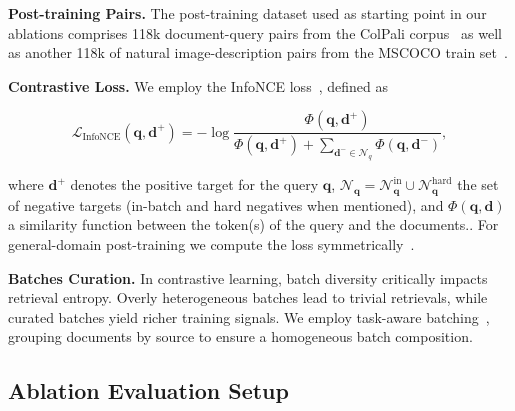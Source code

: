 

\noindent\textbf{Post-training Pairs.} The post-training dataset used as starting point in our ablations comprises 118k document-query pairs from the ColPali corpus~\cite{faysse2025colpaliefficientdocumentretrieval} as well as another 118k of natural image-description pairs from the MSCOCO train set~.

\textbf{Contrastive Loss.} We employ the InfoNCE loss~, defined as

\begin{equation}
\mathcal{L}_{\text{InfoNCE}}(\mathbf{q},\mathbf{d^+})
  =-\log\frac{\Phi(\mathbf{q},\mathbf{d^+})}{\Phi(\mathbf{q},\mathbf{d^+}) + \sum_{\mathbf{d^-}\in\mathcal{N}_q}\Phi(\mathbf{q},\mathbf{d^-})},
\end{equation}

where $\mathbf{d^+}$ denotes the positive target for the query $\mathbf{q}$, $\mathcal{N}_\mathbf{q}=\mathcal{N}_\mathbf{q}^{\text{in}} \cup \mathcal{N}_\mathbf{q}^{\text{hard}}$ the set of negative targets (in-batch and hard negatives when mentioned), and $\Phi(\mathbf{q},\mathbf{d})$ a similarity function between the token(s) of the query and the documents.. 
For general-domain post-training we compute the loss symmetrically~.

\textbf{Batches Curation.} In contrastive learning, batch diversity critically impacts retrieval entropy. Overly heterogeneous batches lead to trivial retrievals, while curated batches yield richer training signals. We employ task-aware batching~, grouping documents by source to ensure a homogeneous batch composition.


\subsection{Ablation Evaluation Setup}


